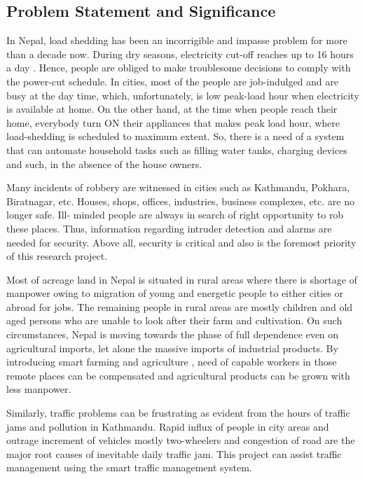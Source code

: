 \documentclass[journal,twoside]{IEEEtran}
\begin{document}
\subsection{Problem Statement and Significance}
In Nepal, load shedding has been an incorrigible and
impasse problem for more than a decade now. During dry
seasons, electricity cut-off reaches up to 16 hours a day \cite{NEA2016}.
Hence, people are obliged to make troublesome decisions to
comply with the power-cut schedule. In cities, most of the
people are job-indulged and are busy at the day time, which,
unfortunately, is low peak-load hour when electricity is
available at home. On the other hand, at the time when people
reach their home, everybody turn ON their appliances that
makes peak load hour, where load-shedding is scheduled to
maximum extent. So, there is a need of a system that can
automate household tasks such as filling water tanks, charging
devices and such, in the absence of the house owners.

Many incidents of robbery are witnessed in cities such as
Kathmandu, Pokhara, Biratnagar, etc. Houses, shops, offices,
industries, business complexes, etc. are no longer safe. Ill-
minded people are always in search of right opportunity to rob
these places. Thus, information regarding intruder detection and
alarms are needed for security. Above all, security is critical and
also is the foremost priority of this research project.

Most of acreage land in Nepal is situated in rural areas
where there is shortage of manpower owing to migration of
young and energetic people to either cities or abroad for jobs.
The remaining people in rural areas are mostly children and old
aged persons who are unable to look after their farm and
cultivation. On such circumstances, Nepal is moving towards
the phase of full dependence even on agricultural imports, let
alone the massive imports of industrial products. By introducing
smart farming and agriculture \cite{Dan2015}, need of capable workers in
those remote places can be compensated and agricultural
products can be grown with less manpower.

Similarly, traffic problems can be frustrating as evident
from the hours of traffic jams and pollution in Kathmandu.
Rapid influx of people in city areas and outrage increment of
vehicles mostly two-wheelers and congestion of road are the
major root causes of inevitable daily traffic jam. This project
can assist traffic management using the smart traffic
management system.
\end{document}
